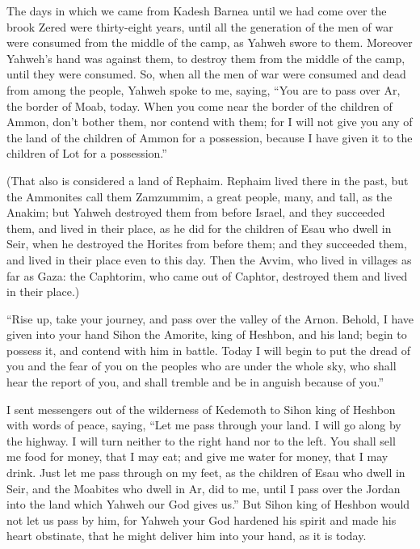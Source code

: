  The days in which we came from Kadesh Barnea until we
had come over the brook Zered were thirty-eight years, until all the
generation of the men of war were consumed from the middle of the camp,
as Yahweh swore to them.  Moreover Yahweh's hand was
against them, to destroy them from the middle of the camp, until they
were consumed.  So, when all the men of war were consumed
and dead from among the people,  Yahweh spoke to me,
saying,  ``You are to pass over Ar, the border of Moab,
today.  When you come near the border of the children of
Ammon, don't bother them, nor contend with them; for I will not give you
any of the land of the children of Ammon for a possession, because I
have given it to the children of Lot for a possession.''

 (That also is considered a land of Rephaim. Rephaim
lived there in the past, but the Ammonites call them Zamzummim,
 a great people, many, and tall, as the Anakim; but
Yahweh destroyed them from before Israel, and they succeeded them, and
lived in their place,  as he did for the children of Esau
who dwell in Seir, when he destroyed the Horites from before them; and
they succeeded them, and lived in their place even to this day.
 Then the Avvim, who lived in villages as far as Gaza:
the Caphtorim, who came out of Caphtor, destroyed them and lived in
their place.)

 ``Rise up, take your journey, and pass over the valley
of the Arnon. Behold, I have given into your hand Sihon the Amorite,
king of Heshbon, and his land; begin to possess it, and contend with him
in battle.  Today I will begin to put the dread of you
and the fear of you on the peoples who are under the whole sky, who
shall hear the report of you, and shall tremble and be in anguish
because of you.''

 I sent messengers out of the wilderness of Kedemoth to
Sihon king of Heshbon with words of peace, saying,  ``Let
me pass through your land. I will go along by the highway. I will turn
neither to the right hand nor to the left.  You shall
sell me food for money, that I may eat; and give me water for money,
that I may drink. Just let me pass through on my feet, 
as the children of Esau who dwell in Seir, and the Moabites who dwell in
Ar, did to me, until I pass over the Jordan into the land which Yahweh
our God gives us.''  But Sihon king of Heshbon would not
let us pass by him, for Yahweh your God hardened his spirit and made his
heart obstinate, that he might deliver him into your hand, as it is
today.

